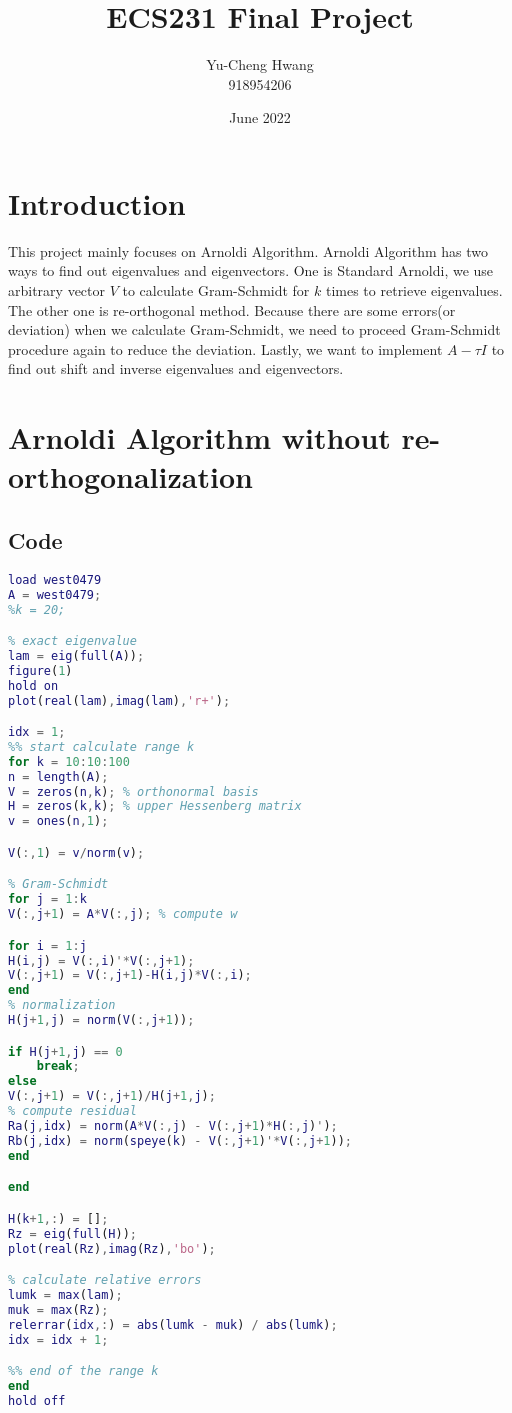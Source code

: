 \documentclass{article}
\title{ECS231 Final Project}
\author{Yu-Cheng Hwang \\ 918954206}
\date{June 2022}
\begin{document}
\maketitle
\section{Introduction}
\begin{flushleft}
This project mainly focuses on Arnoldi Algorithm. Arnoldi Algorithm has two ways to find out eigenvalues and eigenvectors. One is Standard Arnoldi, we use arbitrary vector $V$ to calculate Gram-Schmidt for $k$ times to retrieve eigenvalues. The other one is re-orthogonal method. Because there are some errors(or deviation) when we calculate Gram-Schmidt, we need to proceed Gram-Schmidt procedure again to reduce the deviation. Lastly, we want to implement $A-\tau I$ to find out shift and inverse eigenvalues and eigenvectors.
\end{flushleft}
\section{Arnoldi Algorithm without re-orthogonalization}
\subsection{Code}
\begin{lstlisting}[language=Matlab, caption=Arnoldi-without-re-orthogonalization.m]
load west0479
A = west0479;
%k = 20;

% exact eigenvalue
lam = eig(full(A));
figure(1)
hold on
plot(real(lam),imag(lam),'r+');

idx = 1;
%% start calculate range k
for k = 10:10:100
n = length(A);
V = zeros(n,k); % orthonormal basis
H = zeros(k,k); % upper Hessenberg matrix
v = ones(n,1);

V(:,1) = v/norm(v);

% Gram-Schmidt
for j = 1:k
V(:,j+1) = A*V(:,j); % compute w

for i = 1:j
H(i,j) = V(:,i)'*V(:,j+1);
V(:,j+1) = V(:,j+1)-H(i,j)*V(:,i);
end
% normalization
H(j+1,j) = norm(V(:,j+1));

if H(j+1,j) == 0
    break;
else
V(:,j+1) = V(:,j+1)/H(j+1,j);
% compute residual
Ra(j,idx) = norm(A*V(:,j) - V(:,j+1)*H(:,j)');
Rb(j,idx) = norm(speye(k) - V(:,j+1)'*V(:,j+1));
end

end

H(k+1,:) = []; 
Rz = eig(full(H));
plot(real(Rz),imag(Rz),'bo');

% calculate relative errors
lumk = max(lam);
muk = max(Rz);
relerrar(idx,:) = abs(lumk - muk) / abs(lumk);
idx = idx + 1;

%% end of the range k
end
hold off

\end{lstlisting}
\end{document}
